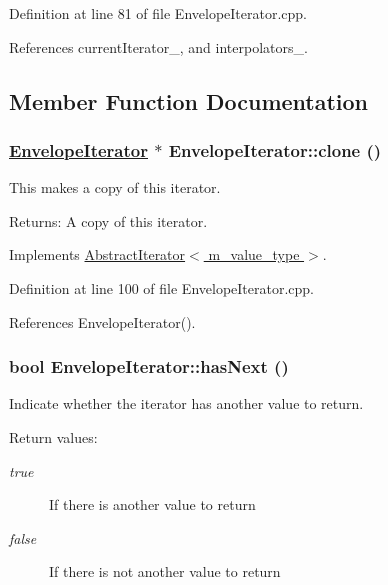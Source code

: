 Definition at line 81 of file Envelope\-Iterator.cpp.

References current\-Iterator\_\-, and interpolators\_\-.

\subsection{Member Function Documentation}
\hypertarget{classEnvelopeIterator_a2}{
\subsubsection[clone]{\setlength{\rightskip}{0pt plus 5cm}\hyperlink{classEnvelopeIterator}{Envelope\-Iterator} $\ast$ Envelope\-Iterator::clone ()}}
\label{classEnvelopeIterator_a2}


This makes a copy of this iterator. \begin{Desc}
\item[Returns:]A copy of this iterator. \end{Desc}


Implements \hyperlink{classAbstractIterator_a0}{Abstract\-Iterator$<$ m\_\-value\_\-type $>$}.

Definition at line 100 of file Envelope\-Iterator.cpp.

References Envelope\-Iterator().\hypertarget{classEnvelopeIterator_a3}{
\subsubsection[hasNext]{\setlength{\rightskip}{0pt plus 5cm}bool Envelope\-Iterator::has\-Next ()}}
\label{classEnvelopeIterator_a3}


Indicate whether the iterator has another value to return. \begin{Desc}
\item[Return values:]
\begin{description}
\item[{\em true}]If there is another value to return \item[{\em false}]If there is not another value to return \end{description}
\end{Desc}


